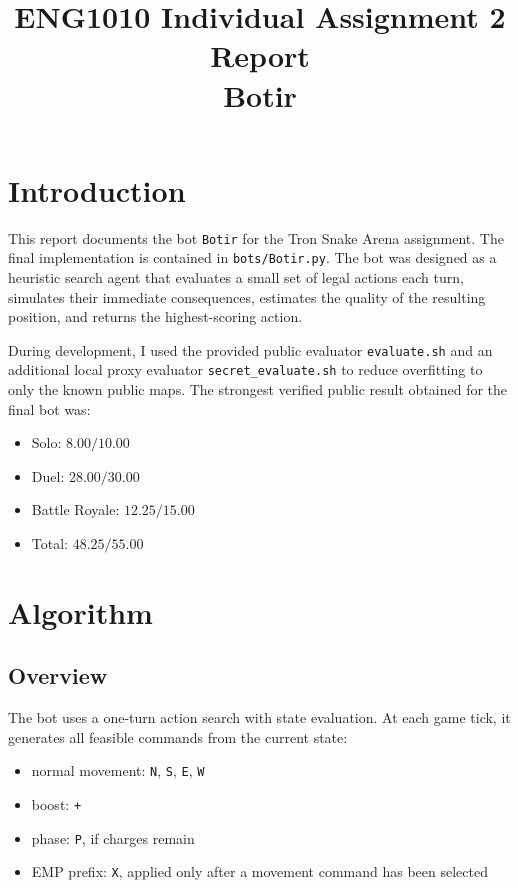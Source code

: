 \documentclass[11pt,a4paper]{article}
\title{ENG1010 Individual Assignment 2 Report\\Botir}
\author{}
\date{}
\begin{document}
\maketitle

\section{Introduction}
This report documents the bot \texttt{Botir} for the Tron Snake Arena assignment. The final implementation is contained in \texttt{bots/Botir.py}. The bot was designed as a heuristic search agent that evaluates a small set of legal actions each turn, simulates their immediate consequences, estimates the quality of the resulting position, and returns the highest-scoring action.

During development, I used the provided public evaluator \texttt{evaluate.sh} and an additional local proxy evaluator \texttt{secret\_evaluate.sh} to reduce overfitting to only the known public maps. The strongest verified public result obtained for the final bot was:
\begin{itemize}[leftmargin=*]
    \item Solo: \(8.00 / 10.00\)
    \item Duel: \(28.00 / 30.00\)
    \item Battle Royale: \(12.25 / 15.00\)
    \item Total: \(48.25 / 55.00\)
\end{itemize}

\section{Algorithm}
\subsection{Overview}
The bot uses a one-turn action search with state evaluation. At each game tick, it generates all feasible commands from the current state:
\begin{itemize}[leftmargin=*]
    \item normal movement: \texttt{N}, \texttt{S}, \texttt{E}, \texttt{W}
    \item boost: \texttt{+}
    \item phase: \texttt{P}, if charges remain
    \item EMP prefix: \texttt{X}, applied only after a movement command has been selected
\end{itemize}
\end{document}
